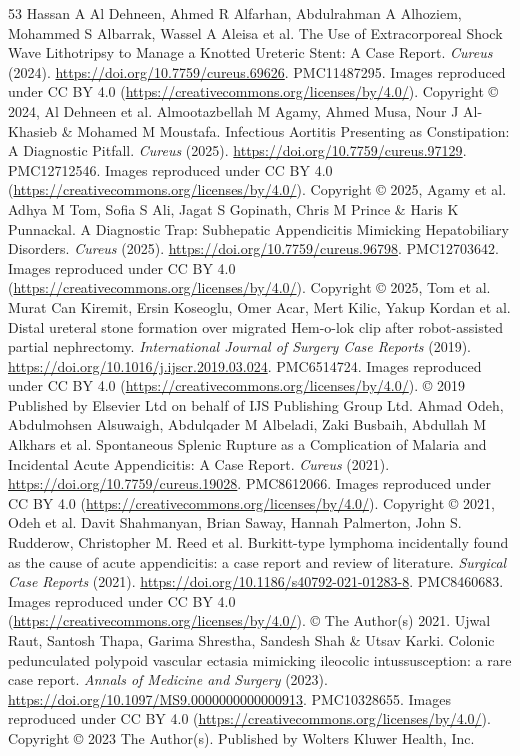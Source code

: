 \begin{thebibliography}{53}
 Hassan A Al Dehneen, Ahmed R Alfarhan, Abdulrahman A Alhoziem, Mohammed S Albarrak, Wassel A Aleisa et al. The Use of Extracorporeal Shock Wave Lithotripsy to Manage a Knotted Ureteric Stent: A Case Report. \textit{Cureus} (2024). \url{https://doi.org/10.7759/cureus.69626}. PMC11487295. Images reproduced under CC BY 4.0 (\url{https://creativecommons.org/licenses/by/4.0/}). Copyright © 2024, Al Dehneen et al.
 Almootazbellah M Agamy, Ahmed Musa, Nour J Al-Khasieb \& Mohamed M Moustafa. Infectious Aortitis Presenting as Constipation: A Diagnostic Pitfall. \textit{Cureus} (2025). \url{https://doi.org/10.7759/cureus.97129}. PMC12712546. Images reproduced under CC BY 4.0 (\url{https://creativecommons.org/licenses/by/4.0/}). Copyright © 2025, Agamy et al.
 Adhya M Tom, Sofia S Ali, Jagat S Gopinath, Chris M Prince \& Haris K Punnackal. A Diagnostic Trap: Subhepatic Appendicitis Mimicking Hepatobiliary Disorders. \textit{Cureus} (2025). \url{https://doi.org/10.7759/cureus.96798}. PMC12703642. Images reproduced under CC BY 4.0 (\url{https://creativecommons.org/licenses/by/4.0/}). Copyright © 2025, Tom et al.
 Murat Can Kiremit, Ersin Koseoglu, Omer Acar, Mert Kilic, Yakup Kordan et al. Distal ureteral stone formation over migrated Hem-o-lok clip after robot-assisted partial nephrectomy. \textit{International Journal of Surgery Case Reports} (2019). \url{https://doi.org/10.1016/j.ijscr.2019.03.024}. PMC6514724. Images reproduced under CC BY 4.0 (\url{https://creativecommons.org/licenses/by/4.0/}). © 2019 Published by Elsevier Ltd on behalf of IJS Publishing Group Ltd.
 Ahmad Odeh, Abdulmohsen Alsuwaigh, Abdulqader M Albeladi, Zaki Busbaih, Abdullah M Alkhars et al. Spontaneous Splenic Rupture as a Complication of Malaria and Incidental Acute Appendicitis: A Case Report. \textit{Cureus} (2021). \url{https://doi.org/10.7759/cureus.19028}. PMC8612066. Images reproduced under CC BY 4.0 (\url{https://creativecommons.org/licenses/by/4.0/}). Copyright © 2021, Odeh et al.
 Davit Shahmanyan, Brian Saway, Hannah Palmerton, John S. Rudderow, Christopher M. Reed et al. Burkitt-type lymphoma incidentally found as the cause of acute appendicitis: a case report and review of literature. \textit{Surgical Case Reports} (2021). \url{https://doi.org/10.1186/s40792-021-01283-8}. PMC8460683. Images reproduced under CC BY 4.0 (\url{https://creativecommons.org/licenses/by/4.0/}). © The Author(s) 2021.
 Ujwal Raut, Santosh Thapa, Garima Shrestha, Sandesh Shah \& Utsav Karki. Colonic pedunculated polypoid vascular ectasia mimicking ileocolic intussusception: a rare case report. \textit{Annals of Medicine and Surgery} (2023). \url{https://doi.org/10.1097/MS9.0000000000000913}. PMC10328655. Images reproduced under CC BY 4.0 (\url{https://creativecommons.org/licenses/by/4.0/}). Copyright © 2023 The Author(s). Published by Wolters Kluwer Health, Inc.

\end{thebibliography}
